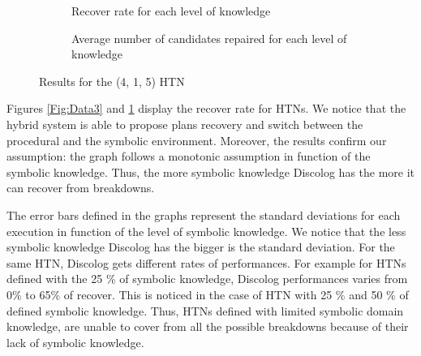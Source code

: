 \documentclass[conference]{IEEEtran}
\begin{document}
			\begin{figure}[t]
				\centering
				\begin{subfigure}[b]{0.5 \columnwidth}            
					\caption{ Recover rate for each level of knowledge}
					\label{Fig:Data1}
				\end{subfigure}
				\hspace{1cm}
				\begin{subfigure}[b]{0.5 \columnwidth}
					\centering
					\caption{Average number of candidates repaired for each level of knowledge}
					\label{Fig:Data2}
				\end{subfigure}
				\caption{Results for the (4, 1, 5) HTN}\label{fig:TOF2}
			\end{figure}	
	\par  Figures \ref{Fig:Data3} and  \ref{Fig:Data1} display the recover rate for HTNs. We notice that the hybrid system is able to propose plans recovery and switch between the procedural and the symbolic environment. Moreover, the results confirm our assumption: the graph follows a monotonic assumption in function of the symbolic knowledge. Thus, the more symbolic knowledge Discolog has the more it can recover from breakdowns. 

	The error bars defined in the graphs represent the standard deviations for each execution in function of the level of symbolic knowledge.  We notice that the less symbolic knowledge Discolog has the bigger is the standard deviation.  For the same HTN, Discolog gets different rates of performances. For example for HTNs defined with the 25 \% of symbolic knowledge, Discolog performances varies from  0\% to 65\%  of recover. This is noticed in the case of HTN with 25 \% and 50 \% of defined symbolic knowledge. Thus, HTNs  defined with limited symbolic domain knowledge, are unable to cover from all the possible breakdowns because of their lack of symbolic knowledge. 
	
\end{document}
